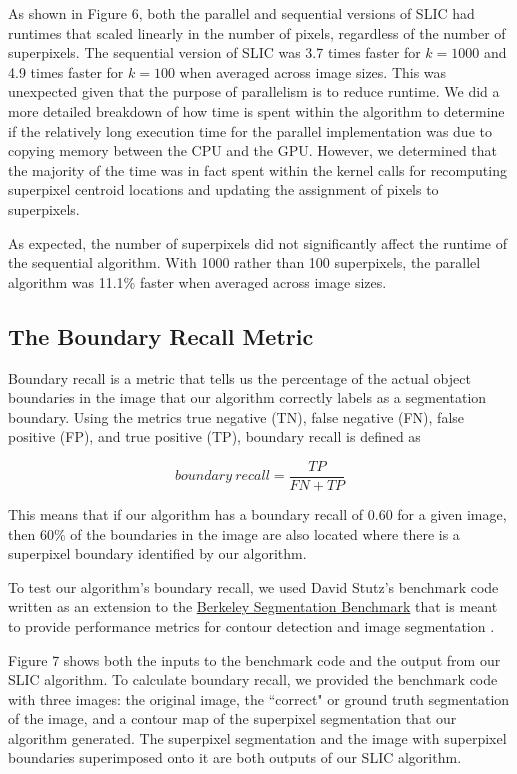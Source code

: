\documentclass[11pt,twocolumn]{article}
\begin{document}
As shown in Figure 6, both the parallel and sequential versions of SLIC had runtimes that scaled linearly in the number of pixels, regardless of the number of superpixels. The sequential version of SLIC was 3.7 times faster for $k=1000$ and 4.9 times faster for $k=100$ when averaged across image sizes. This was unexpected given that the purpose of parallelism is to reduce runtime. We did a more detailed breakdown of how time is spent within the algorithm to determine if the relatively long execution time for the parallel implementation was due to copying memory between the CPU and the GPU. However, we determined that the majority of the time was in fact spent within the kernel calls for recomputing superpixel centroid locations and updating the assignment of pixels to superpixels.

As expected, the number of superpixels did not significantly affect the runtime of the sequential algorithm. With 1000 rather than 100 superpixels, the parallel algorithm was 11.1\% faster when averaged across image sizes.

\subsection{The Boundary Recall Metric}
Boundary recall is a metric that tells us the percentage of the actual object boundaries in the image that our algorithm correctly labels as a segmentation boundary. Using the metrics true negative (TN), false negative (FN), false positive (FP), and true positive (TP), boundary recall is defined as 

\begin{equation}
boundary\ recall = \frac{TP}{FN + TP}
\end{equation}

This means that if our algorithm has a boundary recall of $0.60$ for a given image, then $60\%$ of the boundaries in the image are also located where there is a superpixel boundary identified by our algorithm. 

To test our algorithm's boundary recall, we used David Stutz's benchmark code written as an extension to the \href{https://www2.eecs.berkeley.edu/Research/Projects/CS/vision/grouping/resources.html}{Berkeley Segmentation Benchmark} that is meant to provide performance metrics for contour detection and image segmentation \cite{benchmark}. 

Figure 7 shows both the inputs to the benchmark code and the output from our SLIC algorithm. To calculate boundary recall, we provided the benchmark code with three images: the original image, the ``correct" or ground truth segmentation of the image, and a contour map of the superpixel segmentation that our algorithm generated. The superpixel segmentation and the image with superpixel boundaries superimposed onto it are both outputs of our SLIC algorithm. 
\end{document}
